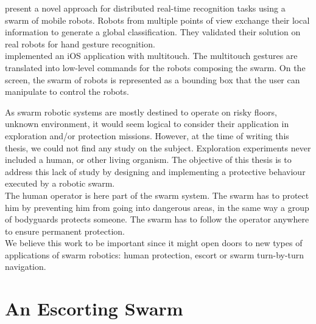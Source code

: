 \documentclass[oneside, a4paper, 12pt]{memoir}
\begin{document}
	\citet{giusti2012cooperative} present a novel approach for distributed real-time recognition tasks using a swarm of mobile robots. Robots from multiple points of view exchange their local information to generate a global classification. They validated their solution on real robots for hand gesture recognition.\\
	\citet{ayanian2014controlling} implemented an iOS application with multitouch. The multitouch gestures are translated into low-level commands for the robots composing the swarm. On the screen, the swarm of robots is represented as a bounding box that the user can manipulate to control the robots.
	

	
		
		
	
	As swarm robotic systems are mostly destined to operate on risky floors, unknown environment, it would seem logical to consider their application in exploration and/or protection missions. However, at the time of writing this thesis, we could not find any study on the subject. Exploration experiments never included a human, or other living organism. The objective of this thesis is to address this lack of study by designing and implementing a protective behaviour executed by a robotic swarm.\\
	The human operator is here part of the swarm system. The swarm has to protect him by preventing him from going into dangerous areas, in the same way a group of bodyguards protects someone. The swarm has to follow the operator anywhere to ensure permanent protection.\\
	We believe this work to be important since it might open doors to new types of applications of swarm robotics: human protection, escort or swarm turn-by-turn navigation.

\chapter{An Escorting Swarm}
\label{chap:escorting_swarm}
\end{document}
